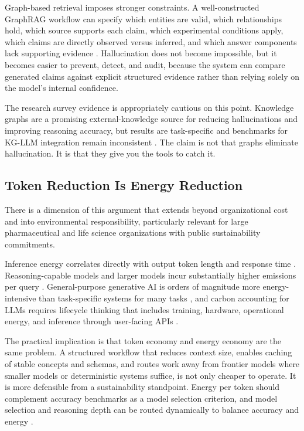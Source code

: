 \documentclass[man,12pt,donotrepeattitle]{apa7}
\begin{document}
Graph-based retrieval imposes stronger constraints. A well-constructed
GraphRAG workflow can specify which entities are valid, which relationships
hold, which source supports each claim, which experimental conditions apply,
which claims are directly observed versus inferred, and which answer
components lack supporting evidence \parencite{peng2025,barry2025}.
Hallucination does not become impossible, but it becomes easier to prevent,
detect, and audit, because the system can compare generated claims against
explicit structured evidence rather than relying solely on the model's
internal confidence.

The research survey evidence is appropriately cautious on this point.
Knowledge graphs are a promising external-knowledge source for reducing
hallucinations and improving reasoning accuracy, but results are
task-specific and benchmarks for KG-LLM integration remain inconsistent
\parencite{agrawal2024,lavrinovics2024}. The claim is not that graphs
eliminate hallucination. It is that they give you the tools to catch it.

\subsection{Token Reduction Is Energy Reduction}

There is a dimension of this argument that extends beyond organizational
cost and into environmental responsibility, particularly relevant for large
pharmaceutical and life science organizations with public sustainability
commitments.

Inference energy correlates directly with output token length and response
time \parencite{poddar2025}. Reasoning-capable models and larger models
incur substantially higher emissions per query \parencite{dauner2025}.
General-purpose generative AI is orders of magnitude more energy-intensive
than task-specific systems for many tasks \parencite{luccioni2024}, and
carbon accounting for LLMs requires lifecycle thinking that includes
training, hardware, operational energy, and inference through user-facing
APIs \parencite{luccioni2023}.

The practical implication is that token economy and energy economy are the
same problem. A structured workflow that reduces context size, enables
caching of stable concepts and schemas, and routes work away from frontier
models where smaller models or deterministic systems suffice, is not only
cheaper to operate. It is more defensible from a sustainability standpoint.
Energy per token should complement accuracy benchmarks as a model selection
criterion, and model selection and reasoning depth can be routed dynamically
to balance accuracy and energy \parencite{wilhelm2025}.
\end{document}
